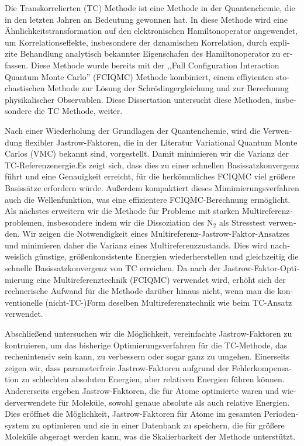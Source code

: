 \cleardoublepage
\begin{otherlanguage}{ngerman}

Die Transkorrelierten (TC) Methode ist eine Methode in der Quantenchemie, die in den letzten Jahren an Bedeutung gewonnen hat. In diese Methode wird eine Ähnlichkeitstransformation auf den elektronischen Hamiltonoperator angewendet, um Korrelationseffekte, insbesondere der dznamischen Korrelation, durch explizite Behandlung analytisch bekannter Eigenschafen des Hamiltonoperator zu erfassen. Diese Methode wurde bereits mit der ,,Full Configuration Interaction Quantum Monte Carlo'' (FCIQMC) Methode kombiniert, einem effiyienten stochastischen Methode zur Lösung der Schrödingergleichung und zur Berechnung physikalischer Observablen. Diese Dissertation untersucht diese Methoden, insbesondere die TC Methode, weiter.

Nach einer Wiederholung der Grundlagen der Quantenchemie, wird die Verwendung flexibler Jastrow-Faktoren, die in der Literatur Variational Quantum Monte Carlos (VMC) bekannt sind, vorgestellt. Damit minimieren wir die Varianz der TC-Referenzenergie.Es zeigt sich, dass dies zu einer schnellen Basissatzkonvergenz führt und eine Genauigkeit erreicht, für die herkömmliches FCIQMC viel größere Basissätze erfordern würde. Außerdem kompaktiert dieses Mimimierungsverfahren auch die Wellenfunktion, was eine effizientere FCIQMC-Berechnung ermöglicht. Als nächstes erweitern wir die Methode für Probleme mit starken Multireferenzproblemen, insbesondere indem wir die Dissoziation des N$_2$ als Stresstest verwenden. Wir zeigen die Notwendigkeit eines Multireferenz-Jastrow-Faktor-Ansatzes und minimieren daher die Varianz eines Multireferenzzustands. Dies wird nachweislich günstige, größenkonsistente Energien wiederherstellen und gleichzeitig die schnelle Basissatzkonvergenz von TC erreichen. Da nach der Jastrow-Faktor-Optimierung eine Multireferenztechnik (FCIQMC) verwendet wird, erhöht sich der rechnerische Aufwand für die Methode darüber hinaus nicht, wenn man die konventionelle (nicht-TC-)Form deselben Multireferenztechnik wie beim TC-Ansatz verwendet.

Abschließend untersuchen wir die Möglichkeit, vereinfachte Jastrow-Faktoren zu kontruieren, um das bisherige Optimierungsverfahren für die TC-Methode, das rechenintensiv sein kann, zu verbessern oder sogar ganz zu umgehen. Einerseits zeigen wir, dass parameterfreie Jastrow-Faktoren aufgrund der Fehlerkompensation zu schlechten absoluten Energien, aber relativen Energien führen können. Andererseits ergeben Jastrow-Faktoren, die für Atome optimierte waren und wiederverwendete für Moleküle, sowohl genaue absolute als auch relative Energien. Dies eröffnet die Möglichkeit, Jastrow-Faktoren für Atome im gesamten Periodensystem zu optimieren und sie in einer Datenbank zu speichern, die für größere Moleküle abgeragt werden kann, was die Skalierbarkeit der Methode unterstützt.

\end{otherlanguage}

